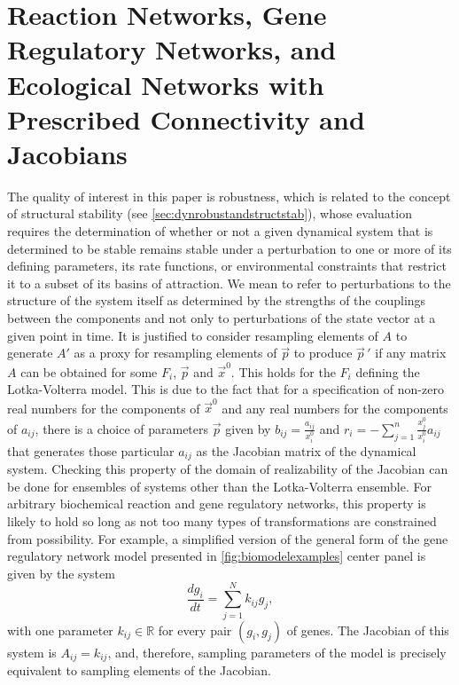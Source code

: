 

\section{Reaction Networks, Gene Regulatory Networks, and Ecological Networks with Prescribed Connectivity and Jacobians}\label{sec:reactionnetjacobian}

The quality of interest in this paper is robustness, which is related to the concept of structural stability (see \ref{sec:dynrobustandstructstab}), whose evaluation requires the determination of whether or not a given dynamical system that is determined to be stable remains stable under a perturbation to one or more of its defining parameters, its rate functions, or environmental constraints that restrict it to a subset of its basins of attraction. We mean to refer to perturbations to the structure of the system itself as determined by the strengths of the couplings between the components and not only to perturbations of the state vector at a given point in time. It is justified to consider resampling elements of $A$ to generate $A'$ as a proxy for resampling elements of $\vec{p}$ to produce $\vec{p}\,'$ if any matrix $A$ can be obtained for some $F_i$, $\vec{p}$ and $\vec{x}^0$. This holds for the $F_i$ defining the Lotka-Volterra model. This is due to the fact that for a specification of non-zero real numbers for the components of $\vec{x}^0$ and any real numbers for the components of $a_{ij}$, there is a choice of parameters $\vec{p}$ given by $b_{ij} = \frac{a_{ij}}{x_i^0}$ and $r_i = - \sum_{j=1}^n \frac{x_j^0}{x_i^0} a_{ij}$ that generates those particular $a_{ij}$ as the Jacobian matrix of the dynamical system. Checking this property of the domain of realizability of the Jacobian can be done for ensembles of systems other than the Lotka-Volterra ensemble. For arbitrary biochemical reaction and gene regulatory networks, this property is likely to hold so long as not too many types of transformations are constrained from possibility. For example, a simplified version of the general form of the gene regulatory network model presented in \ref{fig:biomodelexamples} center panel is given by the system
\begin{equation}
\frac{dg_i}{dt} = \sum_{j=1}^N k_{ij} g_j,
\end{equation}
with one parameter $k_{ij} \in \mathbb{R}$ for every pair $(g_i,g_j)$ of genes. The Jacobian of this system is $A_{ij} = k_{ij}$, and, therefore, sampling parameters of the model is precisely equivalent to sampling elements of the Jacobian.

